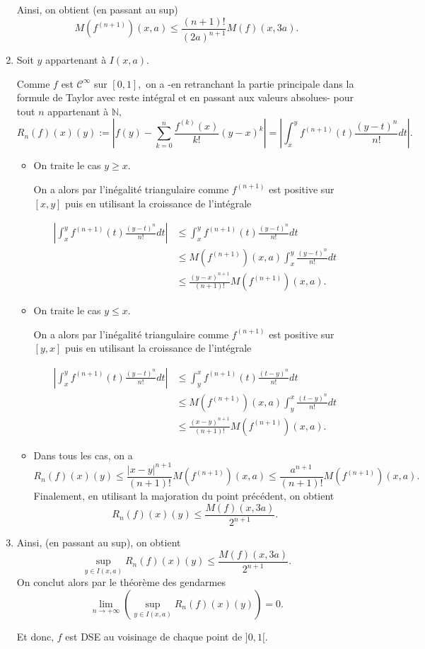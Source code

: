 \begin{enumerate}
Ainsi, on obtient (en passant au sup) $$M(f^{(n+1)})(x,a)\leq \frac{(n+1)!}{(2a)^{n+1}}M(f)(x,3a).$$

\item Soit $y$ appartenant \`{a} $I(x,a).$ 

Comme $f$ est $\mathcal{C}^{\infty}$ sur $[0,1],$ on a -en retranchant la partie principale dans la formule de Taylor avec reste int\'{e}gral et en passant aux valeurs absolues- pour tout $n$ appartenant \`{a} $\mathbb{N},$
$$R_{n}(f)(x)(y):=\left\vert f(y)-\sum_{k=0}^{n}\frac{f^{(k)}(x)}{k!}(y-x)^{k} \right\vert = \left\vert \int_{x}^{y}f^{(n+1)}(t)\frac{(y-t)^{n}}{n!}dt \right\vert.$$

\begin{itemize}
\item On traite le cas $y\geq x.$ 

On a alors par l'in\'{e}galit\'{e} triangulaire comme $f^{(n+1)}$ est positive sur $[x,y]$ puis en utilisant la croissance de l'int\'{e}grale

\begin{align*}
\left \vert \int_{x}^{y}f^{(n+1)}(t)\frac{(y-t)^{n}}{n!}dt \right \vert & \leq \int_{x}^{y}f^{(n+1)}(t)\frac{(y-t)^{n}}{n!}dt\\
& \leq M(f^{(n+1)})(x,a)\int_{x}^{y}\frac{(y-t)^{n}}{n!}dt\\
& \leq \frac{(y-x)^{n+1}}{(n+1)!}M(f^{(n+1)})(x,a).
\end{align*}

\item On traite le cas $y\leq x.$ 

On a alors par l'in\'{e}galit\'{e} triangulaire comme $f^{(n+1)}$ est positive sur $[y,x]$ puis en utilisant la croissance de l'int\'{e}grale 

\begin{align*}
\left\vert \int_{x}^{y}f^{(n+1)}(t)\frac{(y-t)^{n}}{n!}dt \right\vert & \leq \int_{y}^{x}f^{(n+1)}(t)\frac{(t-y)^{n}}{n!}dt\\
& \leq M(f^{(n+1)})(x,a)\int_{y}^{x}\frac{(t-y)^{n}}{n!}dt\\
& \leq \frac{ (x-y)^{n+1}}{(n+1)!}M(f^{(n+1)})(x,a).
\end{align*}

\item Dans tous les cas, on a $$R_{n}(f)(x)(y)\leq \frac{ \vert x-y\vert^{n+1}}{(n+1)!}M(f^{(n+1)})(x,a)\leq \frac{a^{n+1}}{(n+1)!}M(f^{(n+1)})(x,a).$$
Finalement, en utilisant la majoration du point pr\'{e}c\'{e}dent, on obtient $$R_{n}(f)(x)(y)\leq \frac{M(f)(x,3a)}{2^{n+1}}.$$
\end{itemize}

\item Ainsi, (en passant au sup), on obtient $$\sup_{y \in I(x,a)} R_{n}(f)(x)(y)\leq \frac{M(f)(x,3a)}{2^{n+1}}.$$ On conclut alors par le th\'{e}or\`{e}me des gendarmes $$\lim_{n\rightarrow +\infty} \left(\sup_{y \in I(x,a)} R_{n}(f)(x)(y)\right)=0.$$

Et donc, $f$ est DSE au voisinage de chaque point de $]0,1[.$

\end{enumerate}


